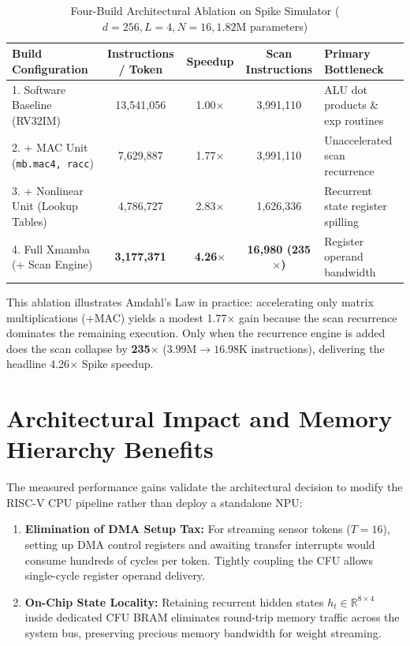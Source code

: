 \documentclass[11pt,a4paper,oneside]{report}
\begin{document}
\begin{table}[!htbp]
\caption[Four-Build Architectural Ablation on Spike Simulator (d=256, L=4)]{Four-Build Architectural Ablation on Spike Simulator ($d=256, L=4, N=16, 1.82\text{M}$ parameters)}
\label{tab:spike_ablation}
\centering
\begin{tabularx}{\linewidth}{lcccY}
\toprule
\textbf{Build Configuration} & \textbf{Instructions / Token} & \textbf{Speedup} & \textbf{Scan Instructions} & \textbf{Primary Bottleneck} \\
. Software Baseline (RV32IM) & 13,541,056 & 1.00$\times$ & 3,991,110 & ALU dot products \& exp routines \\
2. + MAC Unit (\texttt{mb.mac4, racc}) & 7,629,887 & 1.77$\times$ & 3,991,110 & Unaccelerated scan recurrence \\
3. + Nonlinear Unit (Lookup Tables) & 4,786,727 & 2.83$\times$ & 1,626,336 & Recurrent state register spilling \\
4. Full Xmamba (+ Scan Engine) & \textbf{3,177,371} & \textbf{4.26$\times$} & \textbf{16,980 (235$\times$)} & Register operand bandwidth \\
\bottomrule
\end{tabularx}
\end{table}

This ablation illustrates Amdahl's Law in practice: accelerating only matrix multiplications (+MAC) yields a modest 1.77$\times$ gain because the scan recurrence dominates the remaining execution. Only when the recurrence engine is added does the scan collapse by \textbf{235$\times$} ($3.99\text{M} \to 16.98\text{K}$ instructions), delivering the headline 4.26$\times$ Spike speedup.

\section{Architectural Impact and Memory Hierarchy Benefits}
The measured performance gains validate the architectural decision to modify the RISC-V CPU pipeline rather than deploy a standalone NPU:
\begin{enumerate}
    \item \textbf{Elimination of DMA Setup Tax:} For streaming sensor tokens ($T=16$), setting up DMA control registers and awaiting transfer interrupts would consume hundreds of cycles per token. Tightly coupling the CFU allows single-cycle register operand delivery.
    \item \textbf{On-Chip State Locality:} Retaining recurrent hidden states $h_t \in \mathbb{R}^{8 \times 4}$ inside dedicated CFU BRAM eliminates round-trip memory traffic across the system bus, preserving precious memory bandwidth for weight streaming.
\end{enumerate}
\end{document}
